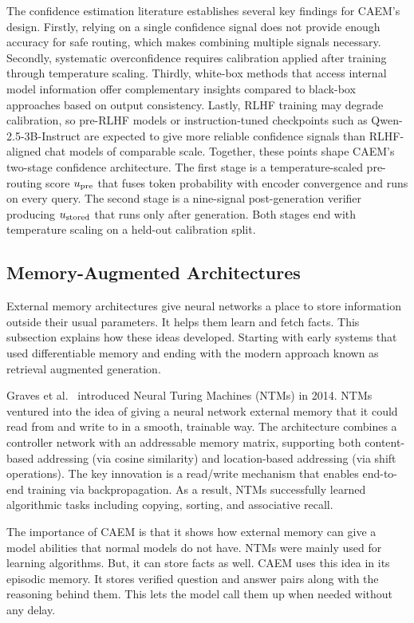 The confidence estimation literature establishes several key findings for CAEM's design. Firstly, relying on a single confidence signal does not provide enough accuracy for safe routing, which makes combining multiple signals necessary. Secondly, systematic overconfidence requires calibration applied after training through temperature scaling. Thirdly, white-box methods that access internal model information offer complementary insights compared to black-box approaches based on output consistency. Lastly, RLHF training may degrade calibration, so pre-RLHF models or instruction-tuned checkpoints such as Qwen-2.5-3B-Instruct are expected to give more reliable confidence signals than RLHF-aligned chat models of comparable scale. Together, these points shape CAEM's two-stage confidence architecture. The first stage is a temperature-scaled pre-routing score $u_{\text{pre}}$ that fuses token probability with encoder convergence and runs on every query. The second stage is a nine-signal post-generation verifier producing $u_{\text{stored}}$ that runs only after generation. Both stages end with temperature scaling on a held-out calibration split.

\subsection{Memory-Augmented Architectures}

External memory architectures give neural networks a place to store information outside their usual parameters. It  helps them learn and fetch facts. This subsection explains how these ideas developed. Starting with early systems that used differentiable memory and ending with the modern approach known as retrieval augmented generation.

Graves et al.\ \cite{graves2014neural} introduced Neural Turing Machines (NTMs) in 2014. NTMs ventured into the idea of giving a neural network external memory that it could read from and write to in a smooth, trainable way. The architecture combines a controller network with an addressable memory matrix, supporting both content-based addressing (via cosine similarity) and location-based addressing (via shift operations). The key innovation is a read/write mechanism that enables end-to-end training via backpropagation. As a result, NTMs successfully learned algorithmic tasks including copying, sorting, and associative recall.

The importance of CAEM is that it shows how external memory can give a model abilities that normal models do not have. NTMs were mainly used for learning algorithms. But, it can store facts as well. CAEM uses this idea in its episodic memory. It stores verified question and answer pairs along with the reasoning behind them. This lets the model call them up when needed without any delay.

